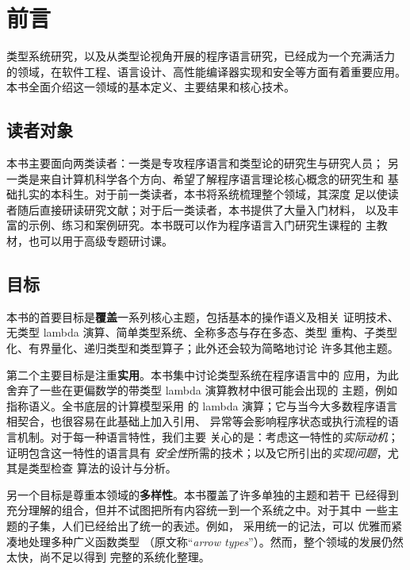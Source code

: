 
\begingroup
\renewcommand{\thefigure}{P-\arabic{figure}}
\setcounter{figure}{0}

\chapter*{前言}
{}

类型系统研究，以及从类型论视角开展的程序语言研究，已经成为一个充满活力
的领域，在软件工程、语言设计、高性能编译器实现和安全等方面有着重要应用。
本书全面介绍这一领域的基本定义、主要结果和核心技术。

\section*{读者对象}

本书主要面向两类读者：一类是专攻程序语言和类型论的研究生与研究人员；
另一类是来自计算机科学各个方向、希望了解程序语言理论核心概念的研究生和
基础扎实的本科生。对于前一类读者，本书将系统梳理整个领域，其深度
足以使读者随后直接研读研究文献；对于后一类读者，本书提供了大量入门材料，
以及丰富的示例、练习和案例研究。本书既可以作为程序语言入门研究生课程的
主教材，也可以用于高级专题研讨课。

\section*{目标}

本书的首要目标是\textbf{覆盖}一系列核心主题，包括基本的操作语义及相关
证明技术、无类型 lambda 演算、简单类型系统、全称多态与存在多态、类型
重构、子类型化、有界量化、递归类型和类型算子；此外还会较为简略地讨论
许多其他主题。

第二个主要目标是注重\textbf{实用}。本书集中讨论类型系统在程序语言中的
应用，为此舍弃了一些在更偏数学的带类型 lambda 演算教材中很可能会出现的
主题，例如指称语义。全书底层的计算模型采用
的
lambda 演算；它与当今大多数程序语言相契合，也很容易在此基础上加入引用、
异常等会影响程序状态或执行流程的语言机制。对于每一种语言特性，我们主要
关心的是：考虑这一特性的\emph{实际动机}；证明包含这一特性的语言具有
\emph{安全性}所需的技术；以及它所引出的\emph{实现问题}，尤其是类型检查
算法的设计与分析。

另一个目标是尊重本领域的\textbf{多样性}。本书覆盖了许多单独的主题和若干
已经得到充分理解的组合，但并不试图把所有内容统一到一个系统之中。对于其中
一些主题的子集，人们已经给出了统一的表述。例如，
\emph{}采用统一的记法，可以
优雅而紧凑地处理多种广义函数类型
（原文称“\textit{arrow types}”）。然而，整个领域的发展仍然太快，尚不足以得到
完整的系统化整理。


